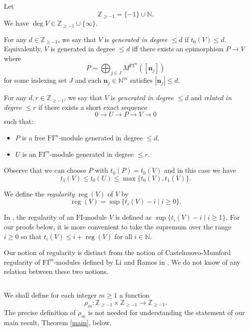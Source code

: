 \documentclass{amsart}
\numberwithin{equation}{section}
\DeclareMathOperator{\reg}{reg}
\newcommand{\N}{{\mathbb{N}}}
\newcommand{\FI}{{\mathrm{FI}}}
\newcommand{\ZZ}{{\mathbb{Z}_{\geqslant -1}}}
\begin{document}
Let 
\[ \ZZ = \{-1\} \cup \N. \]
We have $\deg V \in \ZZ \cup \{\infty\}$. 

For any $d\in\ZZ$, we say that $V$ is \emph{generated in degree $\leqslant d$} if $t_0(V) \leqslant d$. Equivalently, $V$ is generated in degree $\leqslant d$ iff there exists an epimorphism $P \to V$ where
\[ P = \bigoplus_{j\in J} M^{\FI^m}([\mathbf{n}_j]) \]
for some indexing set $J$ and each $\mathbf{n}_j\in \N^m$ satisfies $|\mathbf{n}_j| \leqslant d$.

For any $d, r\in \ZZ$, we say that $V$ is \emph{generated in degree $\leqslant d$} and \emph{related in degree $\leqslant r$} if there exists a short exact sequence
\[ 0 \to U \to P \to V \to 0 \]
such that: 
\begin{itemize}
   \item $P$ is a free $\FI^m$-module generated in degree $\leqslant d$,
   \item $U$ is an $\FI^m$-module generated in degree $\leqslant r$.
\end{itemize}
Observe that we can choose $P$ with $t_0(P)=t_0(V)$ and in this case we have 
\begin{equation} \label{eq:relation degree}
   t_1(V) \leqslant t_0(U) \leqslant \max\{ t_0(V), t_1(V) \}. 
\end{equation}

We define the \emph{regularity} $\reg(V)$ of $V$ by 
\[ \reg(V) = \sup \{ t_i(V)-i \mid i\geqslant 0\}. \]

\begin{remark}
   In \cite{ce}, the regularity of an $\FI$-module $V$ is defined as $\sup \{ t_i(V)-i \mid i\geqslant 1\}$. For our proofs below, it is more convenient to take the supremum over the range $i\geqslant 0$ so that $t_i(V)\leqslant i + \reg(V)$ for all $i\in\N$.
\end{remark}

\begin{remark}
   Our notion of regularity is distinct from the notion of Castelnuovo-Mumford regularity of $\FI^m$-modules defined by Li and Ramos in \cite{lira}. We do not know of any relation between these two notions.
\end{remark}


\subsection{}
We shall define for each integer $m\geqslant 1$ a function
\[ \rho_m : \ZZ \times \ZZ  \to \ZZ. \]
The precise definition of $\rho_m$ is not needed for understanding the statement of our main result, Theorem \ref{main}, below. 
\end{document}
